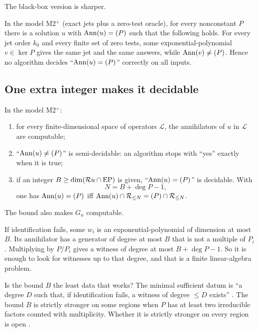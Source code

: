 The black-box version is sharper.

\begin{theorem}\label{f:thm:blackbox}
In the model M2$^+$ (exact jets plus a zero-test oracle), for every nonconstant $P$ there is a solution $u$ with $\operatorname{Ann}(u)=(P)$ such that the following holds. For every jet order $k_0$ and every finite set of zero tests, some exponential-polynomial $v\in\ker P$ gives the same jet and the same answers, while $\operatorname{Ann}(v)\ne(P)$. Hence no algorithm decides ``$\operatorname{Ann}(u)=(P)$'' correctly on all inputs.

\end{theorem}

\subsection{One extra integer makes it decidable}

\begin{theorem}\label{thm:decide}
In the model M2$^+$:
\begin{enumerate}[label=(\roman*)]
\item for every finite-dimensional space of operators $\mathcal L$, the annihilators of $u$ in $\mathcal L$ are computable;
\item ``$\operatorname{Ann}(u)\ne(P)$'' is semi-decidable: an algorithm stops with ``yes'' exactly when it is true;
\item if an integer $B\ge\operatorname{dim}(\mathcal{R} u\cap\mathrm{EP})$ is given, ``$\operatorname{Ann}(u)=(P)$'' is decidable. With
\[
N=B+\deg P-1,
\]
one has $\operatorname{Ann}(u)=(P)$ iff $\operatorname{Ann}(u)\cap\mathcal{R}_{\le N}=(P)\cap\mathcal{R}_{\le N}$.
\end{enumerate}
The bound also makes $G_u$ computable.

\end{theorem}

\begin{intuition}
If identification fails, some $w_i$ is an exponential-polynomial of dimension at most $B$. Its annihilator has a generator of degree at most $B$ that is not a multiple of $P_i$. Multiplying by $P/P_i$ gives a witness of degree at most $B+\deg P-1$. So it is enough to look for witnesses up to that degree, and that is a finite linear-algebra problem.
\end{intuition}

Is the bound $B$ the least data that works? The minimal sufficient datum is ``a degree $D$ such that, if identification fails, a witness of degree $\le D$ exists''  \pw. The bound $B$ is strictly stronger on some regions when $P$ has at least two irreducible factors counted with multiplicity. Whether it is strictly stronger on every region is open \openq{} .


